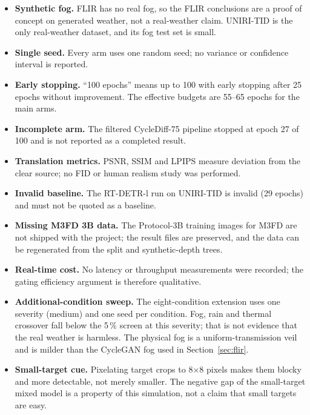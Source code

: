 \documentclass[11pt,a4paper]{article}
\begin{document}
\begin{itemize}[leftmargin=1.4em]
  \item \textbf{Synthetic fog.} FLIR has no real fog, so the FLIR conclusions are
        a proof of concept on generated weather, not a real-weather claim. UNIRI-TID
        is the only real-weather dataset, and its fog test set is small.
  \item \textbf{Single seed.} Every arm uses one random seed; no variance or
        confidence interval is reported.
  \item \textbf{Early stopping.} ``100 epochs'' means up to 100 with early
        stopping after 25 epochs without improvement. The effective budgets are
        55--65 epochs for the main arms.
  \item \textbf{Incomplete arm.} The filtered CycleDiff-75 pipeline stopped at
        epoch 27 of 100 and is not reported as a completed result.
  \item \textbf{Translation metrics.} PSNR, SSIM and LPIPS measure deviation from
        the clear source; no FID or human realism study was performed.
  \item \textbf{Invalid baseline.} The RT-DETR-l run on UNIRI-TID is invalid
        (29 epochs) and must not be quoted as a baseline.
  \item \textbf{Missing M3FD 3B data.} The Protocol-3B training images for M3FD
        are not shipped with the project; the result files are preserved, and the
        data can be regenerated from the split and synthetic-depth trees.
  \item \textbf{Real-time cost.} No latency or throughput measurements were
        recorded; the gating efficiency argument is therefore qualitative.
  \item \textbf{Additional-condition sweep.} The eight-condition extension uses
        one severity (medium) and one seed per condition. Fog, rain and thermal
        crossover fall below the 5\,\% screen at this severity; that is not
        evidence that the real weather is harmless. The physical fog is a
        uniform-transmission veil and is milder than the CycleGAN fog used in
        Section~\ref{sec:flir}.
  \item \textbf{Small-target cue.} Pixelating target crops to 8$\times$8
        pixels makes them blocky and more detectable, not merely smaller. The
        negative gap of the small-target mixed model is a property of this
        simulation, not a claim that small targets are easy.
\end{itemize}
\end{document}
